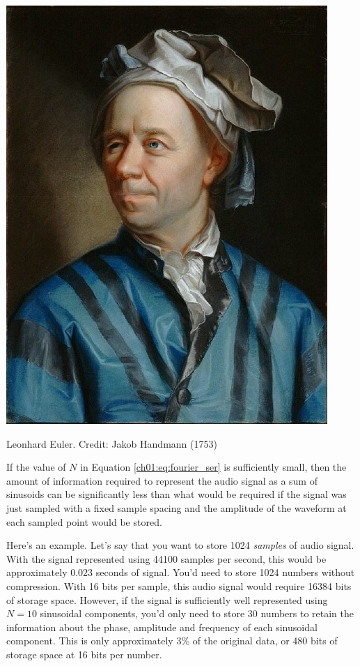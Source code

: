 \begin{marginfigure}
	\begin{center}
		\includegraphics[width=\textwidth]{ch01/figures/euler.jpg}
	\end{center}
	\caption{Leonhard Euler. Credit: Jakob Handmann (1753)}
	\label{fig:euler_pic}
\end{marginfigure}

If the value of $N$ in Equation \ref{ch01:eq:fourier_ser} is
sufficiently small, then the amount of information required to
represent the audio signal as a sum of sinusoids can be significantly
less than what would be required if the signal was just sampled with a
fixed sample spacing and the amplitude of the waveform at each sampled
point would be stored.

Here's an example. Let's say that you want to store 1024
\emph{samples} of
audio signal. With the signal represented using 44100 samples per second,
this would be approximately 0.023 seconds of signal. You'd need to
store 1024 numbers without compression. With 16 bits per sample, this
audio signal would require 16384 bits of storage space. However, if
the signal is sufficiently well represented using $N=10$ sinusoidal
components, you'd only need to store 30 numbers to retain the
information about the phase, amplitude and frequency of each
sinusoidal component. This is only approximately 3\% of the original
data, or 480 bits of storage space at 16 bits per number.

